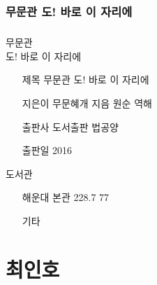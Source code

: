 \documentclass[aspectratio=1610,17pt,xcolor=pdftex,dvipsnames,table,handout]{beamer}
\begin{document}
		\section{무문관  도! 바로 이 자리에}
		\begin{frame} [t,plain]
		\frametitle{}

			\begin{block} {무문관 \\  도! 바로 이 자리에}
			\setlength{\leftmargini}{4em}			
			\begin{itemize}
				\item [제목]  	무문관  도! 바로 이 자리에
				\item [지은이]	무문혜개 지음 원순 역해
				\item [출판사]	도서출판 법공양
				\item [출판일]	2016
			\end{itemize}
			\end{block}						

			\begin{block} {도서관}
			\setlength{\leftmargini}{4em}			
			\begin{itemize}
				\item [해운대]  	본관 228.7 77
				\item [기타]	
			\end{itemize}
			\end{block}						

		\end{frame}						


		\begin{frame} [t,plain]
		\end{frame}			
		\begin{frame} [t,plain]
		\end{frame}			
		\begin{frame} [t,plain]
		\end{frame}			



		\part{ 최인호 }
		\frame{\partpage}
\end{document}
